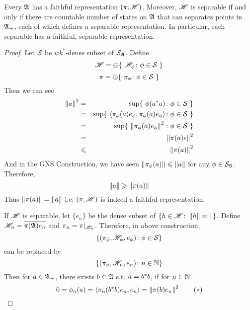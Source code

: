 \documentclass[a4paper,11pt]{report}
\begin{document}
\begin{thm}
	Every \Cs $\mathfrak{A}$ has a faithful representation $(\pi,\mathscr{H})$. Moreover, $\mathscr{H}$ is separable if and only if there are countable number of states on $\mathfrak{A}$ that can separates points in $\mathfrak{A}_{+}$, each of which defines a separable representation. In particular, each separable \Cs has a faithful, separable representation.
\end{thm}
\begin{proof}
	Let $\mathcal{S}_{}$ be $wk^{*}$-dense subset of $\mathcal{S}_{\mathfrak{A}}$. Define
	\begin{equation*}
		\mathscr{H} = \oplus \{~\mathscr{H}_{\phi} \colon \phi \in \mathcal{S}_{}~\}
	\end{equation*} 
	\begin{equation*}
		\pi = \oplus \{~\pi_{\phi} \colon \phi \in \mathcal{S}_{}~\}
	\end{equation*}
	Then we can see
	\begin{eqnarray*}
		\left\lVert a\right\lVert^2 &=& \sup \{~\phi(a^{*}a) \colon \phi \in \mathcal{S}_{}~\}\\ 
		&=& \sup \{~\langle \pi_{\phi}(a)e_{\phi},\pi_{\phi}(a)e_{\phi} \rangle \colon \phi \in \mathcal{S}_{}~\} \\
		&=& \sup \{~\left\lVert\pi_{\phi}(a)e_{\phi}\right\lVert^2 \colon \phi \in \mathcal{S}_{}~\} \\
		&=&	\left\lVert\pi(a)e\right\lVert^2\\
		&\leqslant& \left\lVert\pi(a)\right\lVert^2
	\end{eqnarray*}
	And in the GNS Construction, we have seen $\left\lVert\pi_{\phi}(a)\right\lVert \leqslant \left\lVert a\right\lVert$ for any $\phi \in \mathcal{S}_{\mathfrak{A}}$. Therefore,
	\begin{equation*}
		\left\lVert a\right\lVert \geqslant \left\lVert\pi(a)\right\lVert
	\end{equation*}
	Thus $\left\lVert\pi(a)\right\lVert = \left\lVert a\right\lVert$ i.e. $(\pi,\mathscr{H})$ is indeed a faithful representation.
	\item If $\mathscr{H}$ is separable, let $\{e_n\}$ be the dense subset of $\{h \in \mathscr{H} \colon \left\lVert h\right\lVert =1\}$. Define $\mathscr{H}_n = \overline{\pi(\mathfrak{A})e_n}$ and $\pi_n = \pi|_{\mathscr{H}_n}$. Therefore, in above construction,
	\begin{equation*}
		\{(\pi_{\phi},\mathscr{H}_{\phi},e_{\phi}) \colon \phi \in \mathcal{S}_{}\}
	\end{equation*}
	can be replaced by
	\begin{equation*}
		\{(\pi_n,\mathscr{H}_n,e_n) \colon n \in \mathbb{N}\}
	\end{equation*}
	Then for $a \in \mathfrak{A}_{+}$, there exists $b \in \mathfrak{A}$ s.t. $a = b^{*}b$, if for $n \in \mathbb{N}$
	\begin{equation}
		0=\phi_n(a) = \langle \pi_n(\st{b}b)e_n,e_n \rangle = \norm{\pi(b)e_n}^2 \tag{$*$}

\end{equation}
\end{proof}
\end{document}
